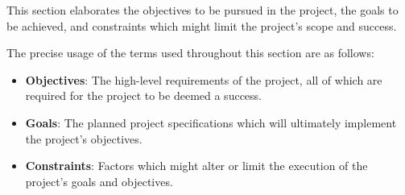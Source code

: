 This section elaborates the objectives to be pursued in the project, the goals to be achieved, and constraints which might limit the project's scope and success.

The precise usage of the terms used throughout this section are as follows:

\begin{itemize}
    \item \textbf{Objectives}: The high-level requirements of the project, 
    all of which are required for the project to be deemed a success.
    
    \item \textbf{Goals}: The planned project specifications which will ultimately implement the project's objectives.
    
    \item \textbf{Constraints}: Factors which might alter or limit the execution of the project's goals and objectives.



\end{itemize}